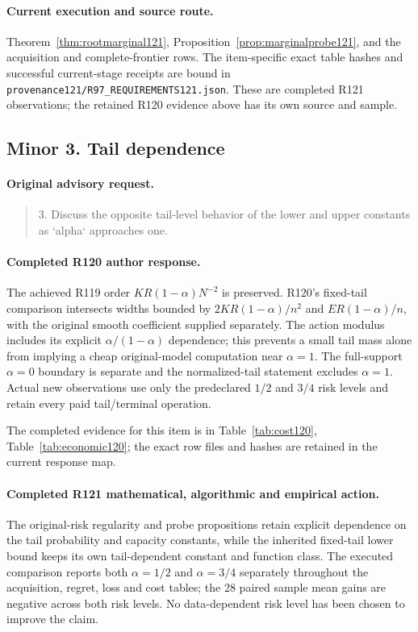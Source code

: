 \paragraph{Current execution and source route.}
Theorem~\ref{thm:rootmarginal121}, Proposition~\ref{prop:marginalprobe121}, and the acquisition and complete-frontier rows.
The item-specific exact table hashes and successful current-stage receipts are bound in \nolinkurl{provenance121/R97_REQUIREMENTS121.json}. These are completed R121 observations; the retained R120 evidence above has its own source and sample.

\subsection{Minor 3. Tail dependence}
\label{response121:minor-3}

\paragraph{Original advisory request.}
\begin{quote}
3. Discuss the opposite tail-level behavior of the lower and upper constants as `alpha` approaches one.
\end{quote}

\paragraph{Completed R120 author response.}
The achieved R119 order $KR(1-\alpha)N^{-2}$ is preserved. R120's fixed-tail comparison intersects widths bounded by $2KR(1-\alpha)/n^2$ and $ER(1-\alpha)/n$, with the original smooth coefficient supplied separately. The action modulus includes its explicit $\alpha/(1-\alpha)$ dependence; this prevents a small tail mass alone from implying a cheap original-model computation near $\alpha=1$. The full-support $\alpha=0$ boundary is separate and the normalized-tail statement excludes $\alpha=1$. Actual new observations use only the predeclared $1/2$ and $3/4$ risk levels and retain every paid tail/terminal operation.

The completed evidence for this item is in Table~\ref{tab:cost120}, Table~\ref{tab:economic120}; the exact row files and hashes are retained in the current response map.

\paragraph{Completed R121 mathematical, algorithmic and empirical action.}
The original-risk regularity and probe propositions retain explicit dependence on the tail probability and capacity constants, while the inherited fixed-tail lower bound keeps its own tail-dependent constant and function class. The executed comparison reports both $\alpha=1/2$ and $\alpha=3/4$ separately throughout the acquisition, regret, loss and cost tables; the 28 paired sample mean gains are negative across both risk levels. No data-dependent risk level has been chosen to improve the claim.

